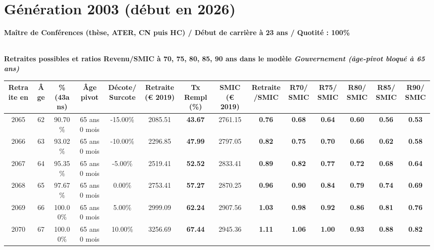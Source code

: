 \newpage 
 
\section{Génération 2003 (début en 2026)\label{MCF_100_2003_23_0}} 
 
{\bf \noindent Maître de Conférences (thèse, ATER, CN puis HC) / Début de carrière à 23 ans / Quotité : 100\%}  ~ 

 ~\\{\bf \noindent Retraites possibles et ratios Revenu/SMIC à 70, 75, 80, 85, 90 ans dans le modèle \emph{Gouvernement (âge-pivot bloqué à 65 ans)}}  
 
\begin{adjustbox}{max width=\textwidth} 
\begin{tabular}[htb]{|c|c||c|c|c||c|c||c|c||c|c|c|c|c|} 
\hline 
 Retraite en &  Âge &  \%(43ans) &  Âge pivot &  Décote/Surcote &  Retraite (\euro{} 2019) &  Tx Rempl(\%) &  SMIC (\euro{} 2019) &  Retraite/SMIC &  R70/SMIC &  R75/SMIC &  R80/SMIC &  R85/SMIC &  R90/SMIC \\ 
\hline \hline 
 2065 &  62 &  90.70\% &  65 ans 0 mois &  -15.00\% &  2085.51 &  {\bf 43.67} &  2761.15 &  {\bf {\color{red} 0.76}} &  {\bf {\color{red} 0.68}} &  {\bf {\color{red} 0.64}} &  {\bf {\color{red} 0.60}} &  {\bf {\color{red} 0.56}} &  {\bf {\color{red} 0.53}} \\ 
\hline 
 2066 &  63 &  93.02\% &  65 ans 0 mois &  -10.00\% &  2296.85 &  {\bf 47.99} &  2797.05 &  {\bf {\color{red} 0.82}} &  {\bf {\color{red} 0.75}} &  {\bf {\color{red} 0.70}} &  {\bf {\color{red} 0.66}} &  {\bf {\color{red} 0.62}} &  {\bf {\color{red} 0.58}} \\ 
\hline 
 2067 &  64 &  95.35\% &  65 ans 0 mois &  -5.00\% &  2519.41 &  {\bf 52.52} &  2833.41 &  {\bf {\color{red} 0.89}} &  {\bf {\color{red} 0.82}} &  {\bf {\color{red} 0.77}} &  {\bf {\color{red} 0.72}} &  {\bf {\color{red} 0.68}} &  {\bf {\color{red} 0.64}} \\ 
\hline 
 2068 &  65 &  97.67\% &  65 ans 0 mois &  0.00\% &  2753.41 &  {\bf 57.27} &  2870.25 &  {\bf {\color{red} 0.96}} &  {\bf {\color{red} 0.90}} &  {\bf {\color{red} 0.84}} &  {\bf {\color{red} 0.79}} &  {\bf {\color{red} 0.74}} &  {\bf {\color{red} 0.69}} \\ 
\hline 
 2069 &  66 &  100.00\% &  65 ans 0 mois &  5.00\% &  2999.09 &  {\bf 62.24} &  2907.56 &  {\bf 1.03} &  {\bf {\color{red} 0.98}} &  {\bf {\color{red} 0.92}} &  {\bf {\color{red} 0.86}} &  {\bf {\color{red} 0.81}} &  {\bf {\color{red} 0.76}} \\ 
\hline 
 2070 &  67 &  100.00\% &  65 ans 0 mois &  10.00\% &  3256.69 &  {\bf 67.44} &  2945.36 &  {\bf 1.11} &  {\bf 1.06} &  {\bf {\color{red} 1.00}} &  {\bf {\color{red} 0.93}} &  {\bf {\color{red} 0.88}} &  {\bf {\color{red} 0.82}} \\ 
\hline 
\hline 
\end{tabular} 
\end{adjustbox} 
 
